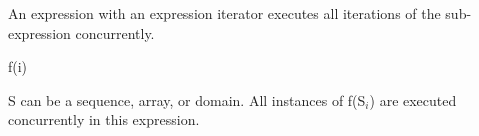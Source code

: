 An expression with an expression iterator executes all iterations of
the sub-expression concurrently.

\begin{example}
\begin{chapel}
[i in S] f(i)
\end{chapel}
S can be a sequence, array, or domain. All instances of f(S$_i$) are
executed concurrently in this expression.
\end{example}
